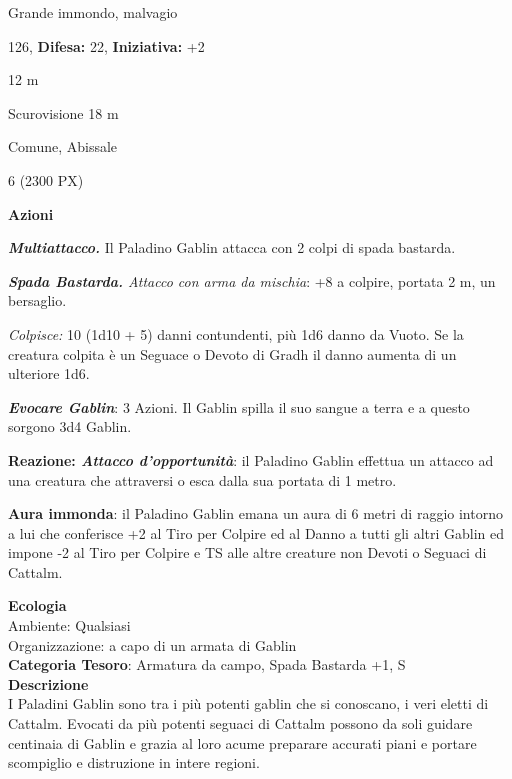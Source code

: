 \begin{multicols}{2}
{
\noindent
\begin{description}[noitemsep, topsep=0pt, parsep=0pt, partopsep=0pt, leftmargin=0cm, labelwidth=2.2cm]
	\item[\textbf{Taglia/Tipo:}] Grande immondo, malvagio
	\item[\textbf{Caratt.:}] 
	\item[\textbf{Punti Ferita:}] 126,  \textbf{Difesa:} 22,  \textbf{Iniziativa:} +2
	\item[\textbf{Movimento:}] 12 m
	\item[\textbf{Tiri Salvez.:}] 
	\item[\textbf{Sensi:}] Scurovisione 18 m
	\item[\textbf{Linguaggi:}] Comune, Abissale
	\item[\textbf{Sfida:}] 6 (2300 PX)\smallskip
\end{description}

\textbf{Azioni}

\emph{\textbf{Multiattacco.}} Il Paladino Gablin attacca con 2 colpi di spada bastarda.

\emph{\textbf{Spada Bastarda.} Attacco con arma da mischia}: +8 a colpire, portata 2 m, un bersaglio.

\emph{Colpisce:} 10 (1d10 + 5) danni contundenti, più 1d6 danno da Vuoto. Se la creatura colpita è un Seguace o Devoto di Gradh il danno aumenta di un ulteriore 1d6.

\emph{\textbf{Evocare Gablin}}: 3 Azioni. Il Gablin spilla il suo sangue a terra e a questo sorgono 3d4 Gablin.

\textbf{Reazione: \emph{Attacco d'opportunità}}: il Paladino Gablin effettua un attacco ad una creatura che attraversi o esca dalla sua portata di 1 metro.

\textbf{Aura immonda}: il Paladino Gablin emana un aura di 6 metri di raggio intorno a lui che conferisce +2 al Tiro per Colpire ed al Danno a tutti gli altri Gablin ed impone -2 al Tiro per Colpire e TS alle altre creature non Devoti o Seguaci di Cattalm.

\textbf{Ecologia}\\
Ambiente: Qualsiasi\\
Organizzazione: a capo di un armata di Gablin\\
\textbf{Categoria Tesoro}: Armatura da campo, Spada Bastarda +1, S\\
\textbf{Descrizione}\\
I Paladini Gablin sono tra i più potenti gablin che si conoscano, i veri eletti di Cattalm. Evocati da più potenti seguaci di Cattalm possono da soli guidare centinaia di Gablin e grazia al loro acume preparare accurati piani e portare scompiglio e distruzione in intere regioni.

}
\end{multicols}
